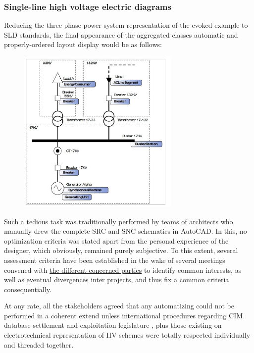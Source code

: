 \subsubsection{Single-line high voltage electric diagrams}
\label{sec:approach:diagram_layout:SLD}

Reducing the three-phase power system representation of the evoked example to SLD standards, the final appearance of the aggregated classes automatic and properly-ordered layout display would be as follows:

\begin{figure}[h!]
    \centering
    \parbox[t]{0.7\textwidth}{
    \href{}{\includegraphics[width=0.7\textwidth]{0.figuras/example_CIM_mapping.png}}
    \label{fig:CIM_diagram-layout}}
\end{figure}

Such a tedious task was traditionally performed by teams of architects who manually drew the complete SRC and SNC schematics in AutoCAD. In this, no optimization criteria was stated apart from the personal experience of the designer, which obviously, remained purely subjective. To this extent, several assessment criteria have been established in the wake of several meetings convened with \hyperref[sec:approach:project-approach:parties]{the different concerned parties} to identify common interests, as well as eventual divergences inter projects, and thus fix a common criteria consequentially. 

At any rate, all the stakeholders agreed that any automatizing could not be performed in a coherent extend unless international procedures regarding CIM database settlement and exploitation legislature \cite{CIMIntelliGrid, CIMIEE}, plus those existing on electrotechnical representation of HV schemes were totally respected individually and threaded together.

